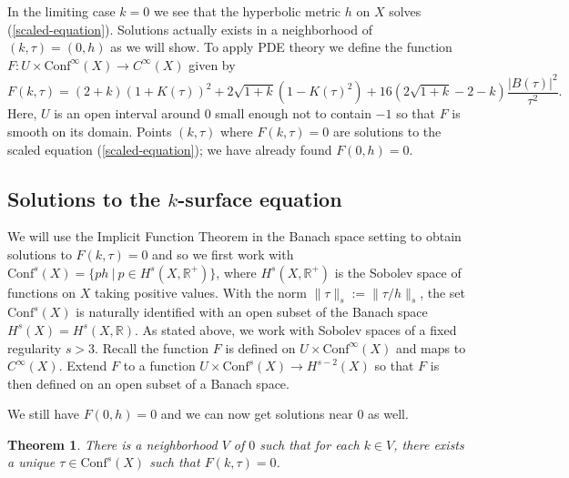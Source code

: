 \documentclass{amsart}
\newcommand{\R}{\mathbb{R}}
\newtheorem{thm}{Theorem}[section]
\begin{document}
In the limiting case $k=0$ we see that the hyperbolic metric $h$ on $X$ solves (\ref{scaled-equation}). 
Solutions actually exists in a neighborhood of $(k,\tau) = (0,h)$ as we will show.
To apply PDE theory we define the function $F : U \times \mathrm{Conf}^\infty(X) \to C^\infty(X)$ given by 
\[
F(k,\tau) = (2+k)(1+K(\tau))^2 + 2\sqrt{1+k}\left(1-K(\tau)^2 \right) +16\left(2\sqrt{1+k} - 2 - k  \right)\frac{|B(\tau)|^2}{\tau^2}.
\]
Here, $U$ is an open interval around $0$ small enough not to contain $-1$ so that $F$ is smooth on its domain. 
Points $(k,\tau)$ where $F(k,\tau) = 0$ are solutions to the scaled equation (\ref{scaled-equation}); we have already found $F(0,h) = 0$.
 
 
 
\subsection{Solutions to the $k$-surface equation} 



We will use the Implicit Function Theorem in the Banach space setting to obtain solutions to $F(k,\tau) = 0$ and so we first work with $\mathrm{Conf}^s(X) = \{ p h \ |\ p \in H^s(X,\R^+)\}$, where $H^s(X,\R^+)$ is the Sobolev space of functions on $X$ taking positive values.
With the norm $\|\tau\|_s := \| \tau/h\|_s$, the set $\mathrm{Conf}^s(X)$ is naturally identified with an open subset of the Banach space $H^s(X) = H^{s}(X,\R)$.
As stated above, we work with Sobolev spaces of a fixed regularity $s > 3$.
Recall the function $F$ is defined on $U \times \mathrm{Conf}^\infty(X)$ and maps to $C^\infty(X)$. 
Extend $F$ to a function $U \times \mathrm{Conf}^s(X) \to H^{s-2}(X)$ so that $F$ is then defined on an open subset of a Banach space. 

We still have $F(0,h) = 0$ and we can now get solutions near $0$ as well.



\begin{thm}
\label{weak-solutions}
There is a neighborhood $V$ of $0$ such that for each $k \in V$, there exists a unique $\tau \in \mathrm{Conf}^s(X)$ such that $F(k,\tau) = 0$.
\end{thm}
\end{document}
